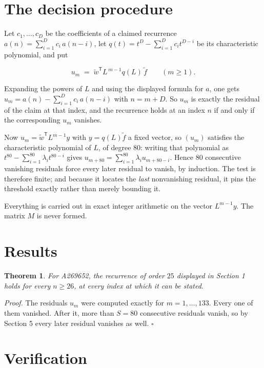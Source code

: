 \documentclass[11pt]{article}
\newtheorem{theorem}{Theorem}
\theoremstyle{definition}
\begin{document}
\section{The decision procedure}

Let $c_1,\dots,c_D$ be the coefficients of a claimed recurrence $a(n) = \sum_{i=1}^{D} c_i\,a(n-i)$, let $q(t) = t^{D} - \sum_{i=1}^{D} c_i t^{D-i}$ be its characteristic polynomial, and put

\[u_m \;=\; \tilde w^{\mathsf T} L^{\,m-1} q(L)\,\tilde f \qquad (m \ge 1).\]

Expanding the powers of $L$ and using the displayed formula for $a$, one gets $u_m = a(n) - \sum_{i=1}^{D} c_i\,a(n-i)$ with $n = m + D$. So $u_m$ is exactly the residual of the claim at that index, and the recurrence holds at an index $n$ if and only if the corresponding $u_m$ vanishes.

Now $u_m = \tilde w^{\mathsf T} L^{m-1} y$ with $y = q(L)\tilde f$ a fixed vector, so $(u_m)$ satisfies the characteristic polynomial of $L$, of degree $80$: writing that polynomial as $t^{80} - \sum_{i=1}^{80} \lambda_i t^{80-i}$ gives $u_{m+80} = \sum_{i=1}^{80} \lambda_i u_{m+80-i}$. Hence $80$ consecutive vanishing residuals force every later residual to vanish, by induction. The test is therefore finite; and because it locates the {\itshape last} nonvanishing residual, it pins the threshold exactly rather than merely bounding it.

Everything is carried out in exact integer arithmetic on the vector $L^{m-1}y$. The matrix $M$ is never formed.

\section{Results}

\begin{theorem} For A269652, the recurrence of order $25$ displayed in Section 1 holds for every $n \ge 26$, at every index at which it can be stated.\end{theorem}

{\itshape Proof.} The residuals $u_m$ were computed exactly for $m = 1,\dots,133$. Every one of them vanished. After it, more than $S = 80$ consecutive residuals vanish, so by Section 5 every later residual vanishes as well. $\square$

\section{Verification}
\end{document}
